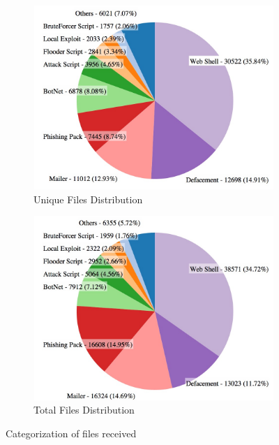 \begin{figure}
\centering
\begin{subfigure}{.5\textwidth}
  \centering
  \includegraphics[width=1.0\linewidth]{Images/uniqueFiles.jpg}
  \caption{Unique Files Distribution}
  \label{fig:uniqueFileDistribution}
\end{subfigure}%
\begin{subfigure}{.5\textwidth}
  \centering
  \includegraphics[width=1.0\linewidth]{Images/multipleFiles.jpg}
  \caption{Total Files Distribution}
  \label{fig:totalFilesDistribution}
\end{subfigure}
\caption{Categorization of files received}
\label{fig:graphCategories}
\end{figure}

